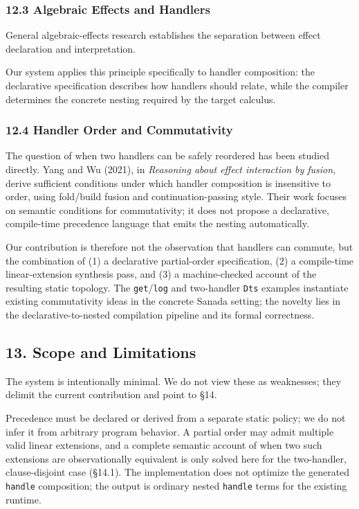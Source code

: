 \documentclass[
  11pt,
]{article}
\begin{document}
\subsubsection{12.3 Algebraic Effects and
Handlers}\label{algebraic-effects-and-handlers}

General algebraic-effects research establishes the separation between
effect declaration and interpretation.

Our system applies this principle specifically to handler composition:
the declarative specification describes how handlers should relate,
while the compiler determines the concrete nesting required by the
target calculus.

\subsubsection{12.4 Handler Order and
Commutativity}\label{handler-order-and-commutativity}

The question of when two handlers can be safely reordered has been
studied directly. Yang and Wu (2021), in \emph{Reasoning about effect
interaction by fusion}, derive sufficient conditions under which handler
composition is insensitive to order, using fold/build fusion and
continuation-passing style. Their work focuses on semantic conditions
for commutativity; it does not propose a declarative, compile-time
precedence language that emits the nesting automatically.

Our contribution is therefore not the observation that handlers can
commute, but the combination of (1) a declarative partial-order
specification, (2) a compile-time linear-extension synthesis pass, and
(3) a machine-checked account of the resulting static topology. The
\texttt{get}/\texttt{log} and two-handler \texttt{Dts} examples
instantiate existing commutativity ideas in the concrete Sanada setting;
the novelty lies in the declarative-to-nested compilation pipeline and
its formal correctness.

\subsection{13. Scope and Limitations}\label{scope-and-limitations}

The system is intentionally minimal. We do not view these as weaknesses;
they delimit the current contribution and point to §14.

Precedence must be declared or derived from a separate static policy; we
do not infer it from arbitrary program behavior. A partial order may
admit multiple valid linear extensions, and a complete semantic account
of when two such extensions are observationally equivalent is only
solved here for the two-handler, clause-disjoint case (§14.1). The
implementation does not optimize the generated \texttt{handle}
composition; the output is ordinary nested \texttt{handle} terms for the
existing runtime.
\end{document}
